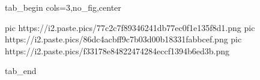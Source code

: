  
 
 
 
 


\ifcmt
  tab_begin cols=3,no_fig,center

     pic https://i2.paste.pics/77c2c7f89346241db77ec0f1e135f8d1.png
		 pic https://i2.paste.pics/86dc4acbff9c7b03d00b18331fabbcef.png
		 pic https://i2.paste.pics/f33178e84822474284eccf1394b6ed3b.png

  tab_end
\fi
